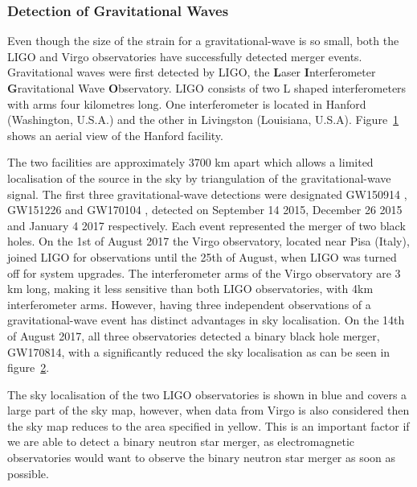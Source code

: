 \subsubsection{Detection of Gravitational Waves}
\label{sec:GWdetection}
Even though the size of the strain for a gravitational-wave is so small, both the LIGO and Virgo observatories have successfully detected merger events. Gravitational waves were first detected by LIGO, the \textbf{L}aser \textbf{I}nterferometer \textbf{G}ravitational Wave \textbf{O}bservatory. LIGO consists of two L shaped interferometers with arms four kilometres long. One interferometer is located in Hanford (Washington, U.S.A.) and the other in Livingston (Louisiana, U.S.A). Figure~\ref{fig:HanfordAerial} shows an aerial view of the Hanford facility. 
\begin{figure}[H]
	\begin{center}
		\caption[\protect]{\protect}
		\label{fig:HanfordAerial}
	\end{center}
\end{figure}
The two facilities are approximately 3700 km apart which allows a limited localisation of the source in the sky by triangulation of the gravitational-wave signal. The first three gravitational-wave detections were designated GW150914 \citep{GW150914}, GW151226 \citep{GW151226} and GW170104 \citep{GW170104}, detected on September 14 2015, December 26 2015 and January 4 2017 respectively. Each event represented the merger of two black holes. On the 1st of August 2017 the Virgo observatory, located near Pisa (Italy), joined LIGO for observations until the 25th of August, when LIGO was turned off for system upgrades. The interferometer arms of the Virgo observatory are 3 km long, making it less sensitive than both LIGO observatories, with 4km interferometer arms. However, having three independent observations of a gravitational-wave event has distinct advantages in sky localisation. On the 14th of August 2017, all three observatories detected a binary black hole merger, GW170814, with a significantly reduced the sky localisation as can be seen in  figure~\ref{fig:GW170814LVCLocalisation}.
\begin{figure}[H]
	\begin{center}
		\adjincludegraphics[width=12.0cm,trim={0cm,0cm,0cm,0cm},clip]{./img/GW170814LVCLocalisation.png} %
		\caption[\protect]{\protect}
		\label{fig:GW170814LVCLocalisation}
	\end{center}
\end{figure}
The sky localisation of the two LIGO observatories is shown in blue and covers a large part of the sky map, however, when data from Virgo is also considered then the sky map reduces to the area specified in yellow. This is an important factor if we are able to detect a binary neutron star merger, as electromagnetic observatories would want to observe the binary neutron star merger as soon as possible. \par

